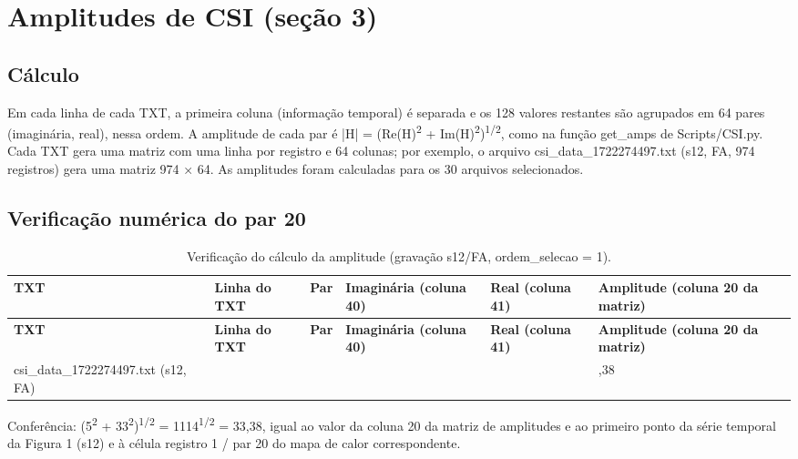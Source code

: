 \section{Amplitudes de CSI (seção 3)}

\subsection{Cálculo}

Em cada linha de cada TXT, a primeira coluna (informação temporal) é separada e os 128 valores restantes são agrupados em 64 pares (imaginária, real), nessa ordem. A amplitude de cada par é |H| = (Re(H)\textsuperscript{2} + Im(H)\textsuperscript{2})\textsuperscript{1/2}, como na função get\_amps de Scripts/CSI.py. Cada TXT gera uma matriz com uma linha por registro e 64 colunas; por exemplo, o arquivo csi\_data\_1722274497.txt (s12, FA, 974 registros) gera uma matriz 974 × 64. As amplitudes foram calculadas para os 30 arquivos selecionados.

\subsection{Verificação numérica do par 20}

{\footnotesize
\begin{longtable}{|>{\centering\arraybackslash}p{4.03cm}|>{\centering\arraybackslash}p{1.45cm}|>{\centering\arraybackslash}p{0.89cm}|>{\centering\arraybackslash}p{2.26cm}|>{\centering\arraybackslash}p{1.93cm}|>{\centering\arraybackslash}p{2.74cm}|}
\caption{Verificação do cálculo da amplitude (gravação s12/FA, ordem\_selecao = 1).}\\
\hline
\textbf{TXT} & \textbf{Linha do TXT} & \textbf{Par} & \textbf{Imaginária (coluna 40)} & \textbf{Real (coluna 41)} & \textbf{Amplitude (coluna 20 da matriz)} \\ \hline
\endfirsthead
\hline
\textbf{TXT} & \textbf{Linha do TXT} & \textbf{Par} & \textbf{Imaginária (coluna 40)} & \textbf{Real (coluna 41)} & \textbf{Amplitude (coluna 20 da matriz)} \\ \hline
\endhead
csi\_data\_1722274497.txt (s12, FA) & 1 & 20 & 33 & 5 & 33,38 \\ \hline
\end{longtable}
}

Conferência: (5\textsuperscript{2} + 33\textsuperscript{2})\textsuperscript{1/2} = 1114\textsuperscript{1/2} = 33,38, igual ao valor da coluna 20 da matriz de amplitudes e ao primeiro ponto da série temporal da Figura 1 (s12) e à célula registro 1 / par 20 do mapa de calor correspondente.

